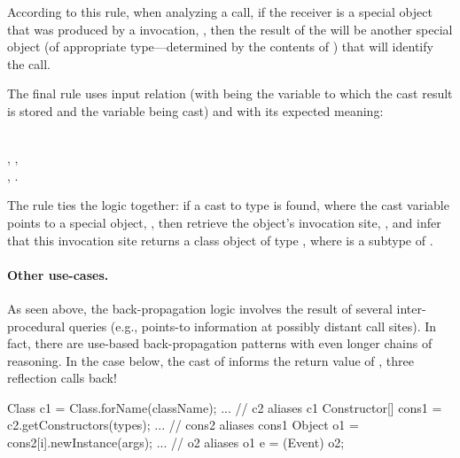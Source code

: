 \noindent According to this rule, when analyzing a 
call, if the receiver is a special object that was produced by a
 invocation, , then the result of the
 will be another special object (of appropriate
type---determined by the contents of ) that
will identify the  call.

The final rule uses input relation  (with
 being the variable to which the cast result is stored and
 the variable being cast) and
 with its expected meaning:

\begin{minipage}{0.95\columnwidth}
  \begin{rules}
      \\
    \tab {}, , \\
    \tab {}, .\\
  \end{rules}
\end{minipage}

\noindent The rule ties the logic together: if a cast to type 
is found, where the cast variable points to a special object,
, then retrieve the object's  invocation site,
, and infer that this invocation site returns a class object
of type , where  is a subtype of .


\paragraph{Other use-cases.}

As seen above, the back-propagation logic involves the result of
several inter-procedural queries (e.g., points-to information at
possibly distant call sites). In fact, there are use-based
back-propagation patterns with even longer chains of reasoning. In the
case below, the cast of  informs the return value of
, three reflection calls back!

\begin{javacodelinum}
Class c1 = Class.forName(className);
...      // c2 aliases c1
Constructor[] cons1 = c2.getConstructors(types); 
...      // cons2 aliases cons1
Object o1 = cons2[i].newInstance(args); 
...      // o2 aliases o1
e = (Event) o2;    
\end{javacodelinum}


